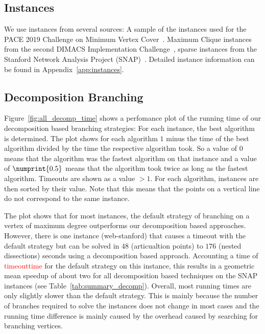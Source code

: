 \documentclass[a4paper,UKenglish,cleveref, autoref, thm-restate]{lipics-v2021}
\begin{document}
\subsection{Instances}
We use instances from several sources: A sample of the instances used for the
PACE 2019 Challenge on Minimum Vertex Cover~\cite{dzulfikar_et_al:LIPIcs:2019:11486}. Maximum Clique instances from the second
DIMACS Implementation Challenge~\cite{johnson1993cliques}, sparse instances from
the Stanford Network Analysis Project (SNAP)~\cite{snapnets}. Detailed instance information can
be found in Appendix~\ref{app:instances}.

\subsection{Decomposition Branching}
Figure~\ref{fig:all_decomp_time} shows a perfomance plot of the running time of
our decomposition based branching strategies: For each instance, the best
algorithm is determined. The plot shows for each algorithm $1$ minus the time of the best algorithm
divided by the time the respective algorithm took. So a value of $0$ means that
the algorithm was the fastest algorithm on that instance and a value of
$\numprint{0.5}$ means that the algorithm took twice as long as the fastest
algorithm. Timeouts are shown as a value $> 1$. For each algorithm, instances
are then sorted by their value. Note that this means that the points on a
vertical line do not correspond to the same instance.

The plot shows that for most instances, the default strategy of branching on a
vertex of maximum degree outperforms our decomposition based approaches.
However, there is one instance (web-stanford) that causes a timeout with the
default strategy but can be solved in $48$ (articualtion points) to $176$ (nested
dissections) seconds using a decomposition based approach. Accounting a time of
\textcolor{red}{timeouttime} for the default strategy on
this instance, this results in a geometric mean speedup of about two for all
decomposition based techniques on the SNAP instances (see Table~\ref{tab:summary_decomp}). Overall, most running
times are only slightly slower than the default strategy. This is mainly because
the number of branches required to solve the instances does not change in most
cases and the running time difference is mainly caused by the overhead caused by
searching for branching vertices.
\end{document}

